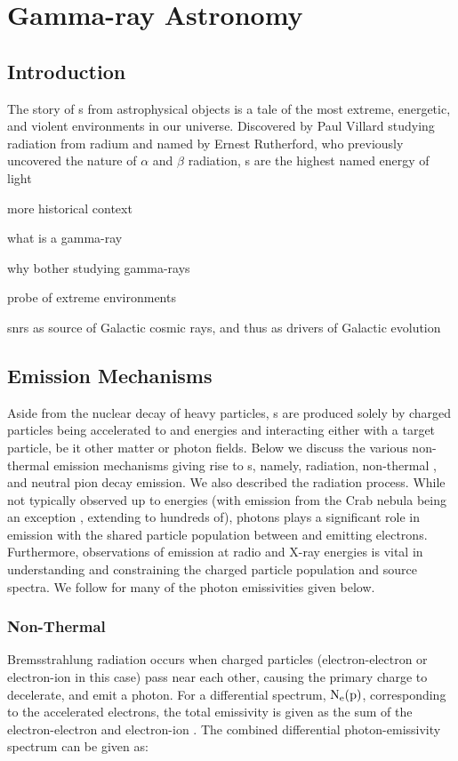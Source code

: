 \chapter{Gamma-ray Astronomy }
\label{chap:gamAstr}

\section{Introduction}\label{gamAstr:intro}
The story of \gam{}s from astrophysical objects is a tale of the most extreme, energetic, and violent environments in our universe. Discovered by Paul Villard studying radiation from radium and named by Ernest Rutherford, who previously uncovered the nature of $\alpha$ and $\beta$ radiation, \gam{}s are the highest named energy of light 

more historical context 

what is a gamma-ray

why bother studying gamma-rays

probe of extreme environments

snrs as source of Galactic cosmic rays, and thus as drivers of Galactic evolution

\section{\gam{} Emission Mechanisms }\label{gamAstr:Emiss}

Aside from the  nuclear decay of heavy particles, \gam{}s are produced solely by charged particles being accelerated to\gev{} and\tev{} energies and interacting either with a target particle, be it other matter or photon fields.  Below we discuss the various non-thermal emission mechanisms giving rise to \gam{}s, namely, \ic{} radiation, non-thermal \brems{}, and neutral pion decay emission. We also described the \sync{} radiation process. While not typically observed up to \gam{} energies (with \sync{}  emission from the Crab nebula being an exception \cite{AbdoCrab}, extending to hundreds of\mev{}), \sync{} photons plays a significant role in \gam{} emission with the shared particle population between \ic{} and \sync{} emitting electrons. Furthermore, observations of \sync{} emission at radio and X-ray energies is vital in understanding and constraining the charged particle population and \gam{} source spectra. We follow \cite{Houck06} for many of the photon emissivities given below.

\subsection{Non-Thermal \brems{}}\label{gamAstr:bremss}
Bremsstrahlung radiation occurs when charged particles (electron-electron or electron-ion in this case) pass near each other, causing the  primary charge to decelerate, and emit a photon. For a differential spectrum, ${\rm N_e(p)}$, corresponding to the accelerated electrons, the total emissivity is given as the sum of the electron-electron and electron-ion \brems{}. The combined differential photon-emissivity spectrum can be given as:

